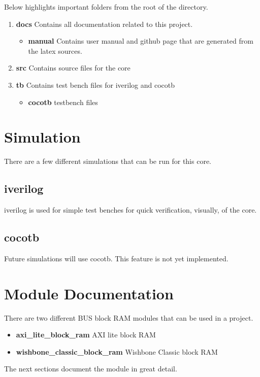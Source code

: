 \par
Below highlights important folders from the root of the directory.

\begin{enumerate}
  \item \textbf{docs} Contains all documentation related to this project.
    \begin{itemize}
      \item \textbf{manual} Contains user manual and github page that are generated from the latex sources.
    \end{itemize}
  \item \textbf{src} Contains source files for the core
  \item \textbf{tb} Contains test bench files for iverilog and cocotb
    \begin{itemize}
      \item \textbf{cocotb} testbench files
    \end{itemize}
\end{enumerate}

\newpage

\section{Simulation}
\par
There are a few different simulations that can be run for this core.

\subsection{iverilog}
\par
iverilog is used for simple test benches for quick verification, visually, of the core.

\subsection{cocotb}
\par
Future simulations will use cocotb. This feature is not yet implemented.

\newpage

\section{Module Documentation} \label{Module Documentation}

\par
There are two different BUS block RAM modules that can be used in a project.

\begin{itemize}
\item \textbf{axi\_lite\_block\_ram} AXI lite block RAM\\
\item \textbf{wishbone\_classic\_block\_ram} Wishbone Classic block RAM\\
\end{itemize}
The next sections document the module in great detail.

